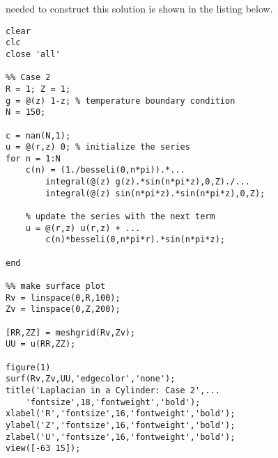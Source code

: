  needed to construct this solution is shown in the listing below.
\begin{lstlisting}[style=myMatlab, name=lec32-ex2]
clear
clc
close 'all'

%% Case 2
R = 1; Z = 1;
g = @(z) 1-z; % temperature boundary condition
N = 150;

c = nan(N,1);
u = @(r,z) 0; % initialize the series
for n = 1:N
    c(n) = (1./besseli(0,n*pi)).*...
        integral(@(z) g(z).*sin(n*pi*z),0,Z)./...
        integral(@(z) sin(n*pi*z).*sin(n*pi*z),0,Z);
    
    % update the series with the next term
    u = @(r,z) u(r,z) + ...
        c(n)*besseli(0,n*pi*r).*sin(n*pi*z);
    
end

%% make surface plot
Rv = linspace(0,R,100);
Zv = linspace(0,Z,200);

[RR,ZZ] = meshgrid(Rv,Zv);
UU = u(RR,ZZ);

figure(1)
surf(Rv,Zv,UU,'edgecolor','none');
title('Laplacian in a Cylinder: Case 2',...
    'fontsize',18,'fontweight','bold');
xlabel('R','fontsize',16,'fontweight','bold');
ylabel('Z','fontsize',16,'fontweight','bold');
zlabel('U','fontsize',16,'fontweight','bold');
view([-63 15]);
\end{lstlisting}
